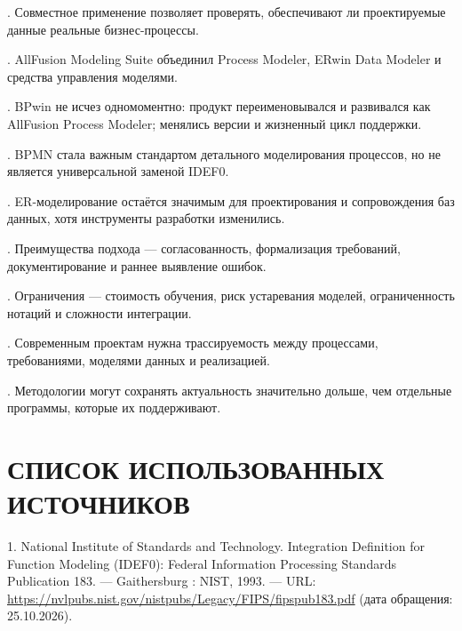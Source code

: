 \documentclass[essaypaper,paper]{pmk-graduate}
\begin{document}
. Совместное применение позволяет проверять, обеспечивают ли проектируемые данные реальные бизнес-процессы.\par

. AllFusion Modeling Suite объединил Process Modeler, ERwin Data Modeler и средства управления моделями.\par

. BPwin не исчез одномоментно: продукт переименовывался и развивался как AllFusion Process Modeler; менялись версии и жизненный цикл поддержки.\par

. BPMN стала важным стандартом детального моделирования процессов, но не является универсальной заменой IDEF0.\par

. ER-моделирование остаётся значимым для проектирования и сопровождения баз данных, хотя инструменты разработки изменились.\par

. Преимущества подхода — согласованность, формализация требований, документирование и раннее выявление ошибок.\par

. Ограничения — стоимость обучения, риск устаревания моделей, ограниченность нотаций и сложности интеграции.\par

. Современным проектам нужна трассируемость между процессами, требованиями, моделями данных и реализацией.\par

. Методологии могут сохранять актуальность значительно дольше, чем отдельные программы, которые их поддерживают.\par

\chapter*{СПИСОК ИСПОЛЬЗОВАННЫХ ИСТОЧНИКОВ}


1. National Institute of Standards and Technology. Integration Definition for Function Modeling (IDEF0): Federal Information Processing Standards Publication 183. — Gaithersburg : NIST, 1993. — URL: \url{https://nvlpubs.nist.gov/nistpubs/Legacy/FIPS/fipspub183.pdf} (дата обращения: 25.10.2026).

\par
\end{document}
